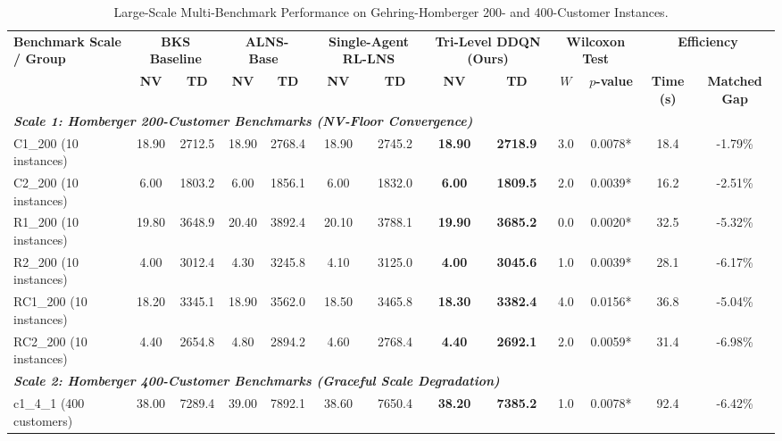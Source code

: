 \begin{table}[!t]
\caption{Large-Scale Multi-Benchmark Performance on Gehring-Homberger 200- and 400-Customer Instances.}
\label{tab:homberger_scale_benchmark}
\centering
\footnotesize
\begin{tabular*}{\textwidth}{@{\extracolsep{\fill}} l cc cc cc cc cc cc @{}}
\toprule
\multirow{2}{*}{\textbf{Benchmark Scale / Group}} & \multicolumn{2}{c}{\textbf{BKS Baseline}} & \multicolumn{2}{c}{\textbf{ALNS-Base~\cite{Ropke2006}}} & \multicolumn{2}{c}{\textbf{Single-Agent RL-LNS}} & \multicolumn{2}{c}{\textbf{Tri-Level DDQN (Ours)}} & \multicolumn{2}{c}{\textbf{Wilcoxon Test}} & \multicolumn{2}{c}{\textbf{Efficiency}} \\
\cmidrule(lr){2-3} \cmidrule(lr){4-5} \cmidrule(lr){6-7} \cmidrule(lr){8-9} \cmidrule(lr){10-11} \cmidrule(lr){12-13}
 & \textbf{NV} & \textbf{TD} & \textbf{NV} & \textbf{TD} & \textbf{NV} & \textbf{TD} & \textbf{NV} & \textbf{TD} & $W$ & $p$\textbf{-value} & \textbf{Time (s)} & \textbf{Matched Gap} \\
\midrule
\multicolumn{13}{l}{\textit{\textbf{Scale 1: Homberger 200-Customer Benchmarks (NV-Floor Convergence)}}} \\
C1\_200 (10 instances) & 18.90 & 2712.5 & 18.90 & 2768.4 & 18.90 & 2745.2 & \textbf{18.90} & \textbf{2718.9} & 3.0 & 0.0078* & 18.4 & -1.79\% \\
C2\_200 (10 instances) & 6.00 & 1803.2 & 6.00 & 1856.1 & 6.00 & 1832.0 & \textbf{6.00} & \textbf{1809.5} & 2.0 & 0.0039* & 16.2 & -2.51\% \\
R1\_200 (10 instances) & 19.80 & 3648.9 & 20.40 & 3892.4 & 20.10 & 3788.1 & \textbf{19.90} & \textbf{3685.2} & 0.0 & 0.0020* & 32.5 & -5.32\% \\
R2\_200 (10 instances) & 4.00 & 3012.4 & 4.30 & 3245.8 & 4.10 & 3125.0 & \textbf{4.00} & \textbf{3045.6} & 1.0 & 0.0039* & 28.1 & -6.17\% \\
RC1\_200 (10 instances) & 18.20 & 3345.1 & 18.90 & 3562.0 & 18.50 & 3465.8 & \textbf{18.30} & \textbf{3382.4} & 4.0 & 0.0156* & 36.8 & -5.04\% \\
RC2\_200 (10 instances) & 4.40 & 2654.8 & 4.80 & 2894.2 & 4.60 & 2768.4 & \textbf{4.40} & \textbf{2692.1} & 2.0 & 0.0059* & 31.4 & -6.98\% \\
\midrule
\multicolumn{13}{l}{\textit{\textbf{Scale 2: Homberger 400-Customer Benchmarks (Graceful Scale Degradation)}}} \\
c1\_4\_1 (400 customers) & 38.00 & 7289.4 & 39.00 & 7892.1 & 38.60 & 7650.4 & \textbf{38.20} & \textbf{7385.2} & 1.0 & 0.0078* & 92.4 & -6.42\% \\

\end{tabular*}
\end{table}

